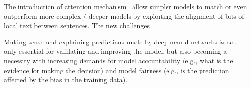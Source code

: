 
The introduction of attention mechanism~\cite{} allow simpler models to match or even outperform more complex / deeper models by exploiting the alignment of bits of local text between sentences. The new challenges

Making sense and explaining predictions made by deep neural networks is not only essential for validating and improving the model, but also becoming a necessity with increasing demands for model accountability (e.g., what is the evidence for making the decision) and model fairness (e.g., is the prediction affected by the bias in the training data).
